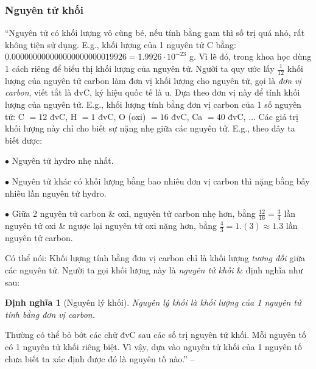 \documentclass{article}
\numberwithin{equation}{section}
\newtheorem{dinhnghia}{Định nghĩa}[section]
\begin{document}
\subsubsection{Nguyên tử khối}
``Nguyên tử có khối lượng vô cùng bé, nếu tính bằng gam thì số trị quá nhỏ, rất không tiện sử dụng. E.g., khối lượng của 1 nguyên tử C bằng: $0.000 000 000 000 000 000 000 019 926 = 1.9926\cdot 10^{-23}$ g. Vì lẽ đó, trong khoa học dùng 1 cách riêng để biểu thị khối lượng của nguyên tử. Người ta quy ước lấy $\frac{1}{12}$ khối lượng của nguyên tử carbon làm đơn vị khối lượng cho nguyên tử, gọi là \textit{đơn vị carbon}, viết tắt là đvC, ký hiệu quốc tế là u. Dựa theo đơn vị này để tính khối lượng của nguyên tử. E.g., khối lượng tính bằng đơn vị carbon của 1 số nguyên tử: C $= 12$ đvC, H $= 1$ đvC, O (oxi) $= 16$ đvC, Ca $= 40$ đvC, $\ldots$ Các giá trị khối lượng này chỉ cho biết sự nặng nhẹ giữa các nguyên tử. E.g., theo đây ta biết được:
\begin{enumerate*}
	\item[$\bullet$] Nguyên tử hydro nhẹ nhất.
	\item[$\bullet$] Nguyên tử khác có khối lượng bằng bao nhiêu đơn vị carbon thì nặng bằng bấy nhiêu lần nguyên tử hydro.
	\item[$\bullet$] Giữa 2 nguyên tử carbon \& oxi, nguyên tử carbon nhẹ hơn, bằng $\frac{12}{16} = \frac{3}{4}$ lần nguyên tử oxi \& ngược lại nguyên tử oxi nặng hơn, bằng $\frac{4}{3} = 1.(3)\approx 1.3$ lần nguyên tử carbon.
\end{enumerate*}

Có thể nói: Khối lượng tính bằng đơn vị carbon chỉ là khối lượng \textit{tương đối} giữa các nguyên tử. Người ta gọi khối lượng này là \textit{nguyên tử khối} \& định nghĩa như sau:

\begin{dinhnghia}[Nguyên lý khối]
	\emph{Nguyên lý khối} là khối lượng của 1 nguyên tử tính bằng đơn vị carbon.
\end{dinhnghia}
Thường có thể bỏ bớt các chữ đvC sau các số trị nguyên tử khối. Mỗi nguyên tố có 1 nguyên tử khối riêng biệt. Vì vậy, dựa vào nguyên tử khối của 1 nguyên tố chưa biết ta xác định được đó là nguyên tố nào.'' -- \cite[p. 18]{SGK_Hoa_Hoc_8}
\end{document}
